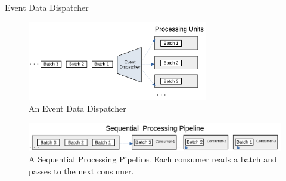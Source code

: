 \documentclass[9pt]{beamer}
\begin{document}
\begin{frame}[fragile]{Event Data Dispatcher  }

        \begin{figure}
            \begin{center}
                \includegraphics[width=0.7\textwidth]{../paper/images/Stream-Batch-Distributions}
                \caption{An Event Data Dispatcher}
                \label{fig:batch-distributions}
            \end{center}
        \end{figure}
     
        \begin{figure}
            \begin{center}
                \includegraphics[width=1\textwidth]{../paper/images/Stream-Batch-Distributions_op2}
                \caption{A Sequential Processing Pipeline. Each consumer reads a batch and passes to the next consumer.}
                \label{fig:Sequential-batch-distributions}
            \end{center}
        \end{figure}

\end{frame}









    

 
\end{document}
